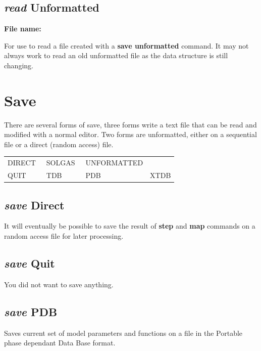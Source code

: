 \documentclass[11pt]{article}
\begin{document}
\hypertarget{Read unformatted}{}
\subsection{{\em read} Unformatted}\label{sc:readunf}

{\bf File name:}

For use to read a file created with a {\bf save unformatted} command.  It
may not always work to read an old unformatted file as the data
structure is still changing.

\hypertarget{Save}{}
\section{Save }

There are several forms of save, three forms write a text file that
can be read and modified with a normal editor.  Two forms are
unformatted, either on a sequential file or a direct (random access)
file.

\begin{tabular}{llll}
  DIRECT~          & SOLGAS~ & UNFORMATTED\\
  QUIT            & TDB    & PDB & XTDB \\
\end{tabular}

\hypertarget{Save direct}{}
\subsection{{\em save} Direct}

It will eventually be possible to save the result of {\bf step} and
{\bf map} commands on a random access file for later processing.

\hypertarget{Save quit}{}
\subsection{{\em save} Quit}

You did not want to save anything.

\hypertarget{Save PDB}{}
\subsection{{\em save} PDB}

Saves current set of model parameters and functions on a file in the
Portable phase dependant Data Base format. 
\end{document}
